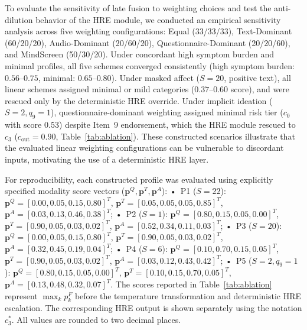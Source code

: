 \documentclass[10pt, conference, letterpaper]{IEEEtran}
\begin{document}
To evaluate the sensitivity of late fusion to weighting choices and test the
anti-dilution behavior of the HRE module, we conducted an empirical sensitivity
analysis across five weighting configurations: Equal (33/33/33), Text-Dominant
(60/20/20), Audio-Dominant (20/60/20), Questionnaire-Dominant (20/20/60), and
MindScreen (50/30/20).
Under concordant high symptom burden and minimal profiles, all five schemes converged
consistently (high symptom burden: $0.56$--$0.75$, minimal: $0.65$--$0.80$).
Under masked affect ($S=20$, positive text), all linear schemes assigned
minimal or mild categories ($0.37$--$0.60$ score), and were rescued only by the
deterministic HRE override.
Under implicit ideation ($S=2, q_9=1$), questionnaire-dominant weighting
assigned minimal risk tier ($c_0$ with score $0.53$) despite Item~9 endorsement,
which the HRE module rescued to $c_3$ ($c_{\text{out}} = 0.90$, Table~\ref{tab:ablation}).
These constructed scenarios illustrate that the evaluated linear weighting
configurations can be vulnerable to discordant inputs, motivating the use of a
deterministic HRE layer.

For reproducibility, each constructed profile was evaluated using explicitly
specified modality score vectors ($\mathbf{p}^Q, \mathbf{p}^T, \mathbf{p}^A$):
•~P1 ($S=22$): $\mathbf{p}^Q=[0.00, 0.05, 0.15, 0.80]^T$, $\mathbf{p}^T=[0.05, 0.05, 0.05, 0.85]^T$, $\mathbf{p}^A=[0.03, 0.13, 0.46, 0.38]^T$;
•~P2 ($S=1$): $\mathbf{p}^Q=[0.80, 0.15, 0.05, 0.00]^T$, $\mathbf{p}^T=[0.90, 0.05, 0.03, 0.02]^T$, $\mathbf{p}^A=[0.52, 0.34, 0.11, 0.03]^T$;
•~P3 ($S=20$): $\mathbf{p}^Q=[0.00, 0.05, 0.15, 0.80]^T$, $\mathbf{p}^T=[0.90, 0.05, 0.03, 0.02]^T$, $\mathbf{p}^A=[0.32, 0.45, 0.19, 0.04]^T$;
•~P4 ($S=6$): $\mathbf{p}^Q=[0.10, 0.70, 0.15, 0.05]^T$, $\mathbf{p}^T=[0.90, 0.05, 0.03, 0.02]^T$, $\mathbf{p}^A=[0.03, 0.12, 0.43, 0.42]^T$;
•~P5 ($S=2, q_9=1$): $\mathbf{p}^Q=[0.80, 0.15, 0.05, 0.00]^T$, $\mathbf{p}^T=[0.10, 0.15, 0.70, 0.05]^T$, $\mathbf{p}^A=[0.13, 0.48, 0.32, 0.07]^T$.
The scores reported in Table~\ref{tab:ablation} represent $\max_k p_k^F$ before
the temperature transformation and deterministic HRE escalation. The corresponding HRE output
is shown separately using the notation $c_3^*$. All values are rounded to two decimal places.
\end{document}
